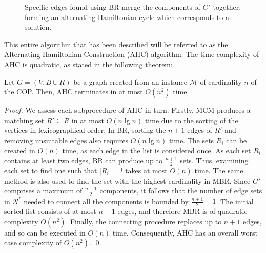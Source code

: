 \documentclass[runningheads]{llncs}
\begin{document}
\begin{figure}[H]	
	\centering
	\begin{subfigure}[h]{0.65\textwidth}
		
		\label{fig:mpsconnect}
	\end{subfigure}
	\begin{subfigure}[h]{0.65\textwidth}
		
		\label{fig:mpscycle}
	\end{subfigure}
	\begin{subfigure}[h]{0.75\textwidth}
		
		\label{fig:mpspath}
	\end{subfigure}
	\caption{Specific edges found using BR merge the components of $G'$ together, forming an alternating Hamiltonian cycle which corresponds to a solution.}
	\label{fig:connect/cycle}
\end{figure}

\noindent This entire algorithm that has been described will be referred to as the Alternating Hamiltonian Construction (AHC) algorithm. The time complexity of AHC is quadratic, as stated in the following theorem:

\begin{theorem}
	\label{thm:copsoln}
	Let $G=(V, B \cup R)$ be a graph created from an instance $\mathcal{M}$ of cardinality $n$ of the COP. Then, AHC terminates in at most $O(n^2)$ time.
\end{theorem}

\begin{proof}
	We assess each subprocedure of AHC in turn. Firstly, MCM produces a matching set $R' \subseteq R$ in at most $O(n \lg n)$ time due to the sorting of the vertices in lexicographical order. In BR, sorting the $n+1$ edges of $R'$ and removing unsuitable edges also requires $O(n \lg n)$ time. The sets $R_i$ can be created in $O(n)$ time, as each edge in the list is considered once. As each set $R_i$ contains at least two edges, BR can produce up to $\frac{n+1}{2}$ sets. Thus, examining each set to find one such that $|R_i| = l$ takes at most $O(n)$ time. The same method is also used to find the set with the highest cardinality in MBR. Since $G'$ comprises a maximum of $\frac{n+1}{2}$ components, it follows that the number of edge sets in $\mathcal{R}^{*}$ needed to connect all the components is bounded by $\frac{n+1}{2}-1$. The initial sorted list consists of at most $n-1$ edges, and therefore MBR is of quadratic complexity $O(n^2)$. Finally, the connecting procedure replaces up to $n+1$ edges, and so can be executed in $O(n)$ time. Consequently, AHC has an overall worst case complexity of $O(n^2)$. \qed
\end{proof}	
\end{document}
